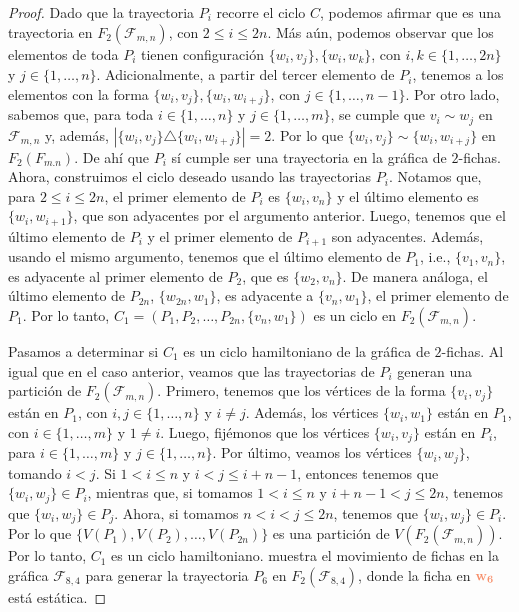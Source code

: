 \begin{proof}
    Dado que la trayectoria $P_i$ recorre el ciclo $C$, podemos afirmar que es
    una trayectoria en $F_2(\mathcal{F}_{m,n})$, con $2\leq i \leq 2n$. M\'as
    a\'un, podemos observar que los elementos de toda $P_i$ tienen
    configuraci\'on $\{w_i,v_j\},\{w_i,w_k\}$, con $i, k\in \{1, \dots, 2n\}$ y
    $j \in \{1, \dots, n\}$. Adicionalmente, a partir del tercer elemento de
    $P_i$, tenemos a los elementos con la forma $\{w_i,v_j\},\{w_i,w_{i+j}\}$,
    con $j \in \{1, \dots, n-1\}$.  Por otro lado, sabemos que, para toda $i \in
    \{1, \dots, n\}$ y $j \in \{1, \dots, m\}$, se cumple que $v_i \sim w_j$ en
    $\mathcal{F}_{m,n}$ y, adem\'as, $|\{w_i,v_j\} \triangle \{w_i,
    w_{i+j}\}|=2$. Por lo que $\{w_i,v_j\} \sim \{w_i, w_{i+j}\}$ en
    $F_2(F_{m.n})$. De ah\'i que $P_i$ s\'i cumple ser una trayectoria en la
    gr\'afica de $2$-fichas. Ahora, construimos el ciclo deseado usando las
    trayectorias $P_i$. Notamos que, para $2 \leq i \leq 2n$, el primer elemento
    de $P_i$ es $\{w_i, v_n\}$ y el \'ultimo elemento es $\{w_i, w_{i+1}\}$, que
    son adyacentes por el argumento anterior. Luego, tenemos que el \'ultimo
    elemento de $P_i$ y el primer elemento de $P_{i+1}$ son adyacentes.
    Adem\'as, usando el mismo argumento, tenemos que el \'ultimo elemento de
    $P_1$, i.e., $\{v_1,v_n\}$, es adyacente al primer elemento de $P_2$, que es
    $\{w_2,v_n\}$. De manera an\'aloga, el \'ultimo elemento de $P_{2n}$,
    $\{w_{2n},w_1\}$, es adyacente a $\{v_n,w_1\}$, el primer elemento de $P_1$.
    Por lo tanto, $C_1 = (P_1,P_2, \dots, P_{2n},\{v_n,w_1\})$ es un ciclo en
    $F_2(\mathcal{F}_{m,n})$. 

    Pasamos a determinar si $C_1$ es un ciclo hamiltoniano de la gr\'afica de
    $2$-fichas. Al igual que en el caso anterior, veamos que las trayectorias de
    $P_i$ generan una partici\'on de $F_2(\mathcal{F}_{m,n})$. Primero, tenemos
    que los v\'ertices de la forma $\{v_i,v_j\}$ est\'an en $P_1$, con $i,j \in
    \{1, \dots, n\}$ y $i \neq j$. Adem\'as, los v\'ertices $\{w_i,w_1\}$
    est\'an en $P_1$, con $i \in \{1, \dots, m\}$ y $1 \neq i$. Luego,
    fij\'emonos que los v\'ertices $\{w_i,v_j\}$ est\'an en $P_i$, para $i\in
    \{1, \dots, m\}$ y $j \in \{1, \dots, n\}$. Por \'ultimo, veamos los
    v\'ertices $\{w_i,w_j\}$, tomando $i < j$. Si $1 < i \leq n$ y $i < j \leq
    i+n-1$, entonces tenemos que $\{w_i,w_j\} \in P_i$, mientras que, si tomamos
    $1 < i \leq n$ y $i+n-1 < j \leq 2n$, tenemos que $\{w_i,w_j\} \in P_j$.
    Ahora, si tomamos $n<i<j \leq 2n$, tenemos que $\{w_i,w_j\} \in P_i$. Por lo
    que $\{V(P_1),V(P_2), \dots, V(P_{2n})\}$ es una partici\'on de
    $V(F_2(\mathcal{F}_{m,n}))$. Por lo tanto, $C_1$ es un ciclo hamiltoniano.
     muestra el movimiento de fichas en la gr\'afica
    $\mathcal{F}_{8,4}$ para generar la trayectoria $P_6$ en
    $F_2(\mathcal{F}_{8,4})$, donde la ficha en ${\color{coral}\bf w_6}$ est\'a
    est\'atica.



\end{proof}
